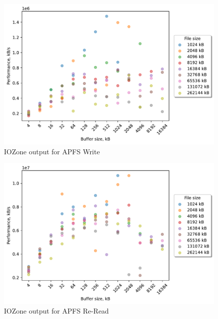 \begin{figure}[!htb]
	\label{fig:bench_apfs_write}
	\begin{center}
		\includegraphics[width=1.0\textwidth]{figures/benchmarking/local/Write.pdf}
	\end{center}
	\caption{IOZone output for \gls{APFS} Write}
\end{figure}

\begin{figure}[!htb]
	\label{fig:bench_apfs_re_read}
	\begin{center}
		\includegraphics[width=1.0\textwidth]{figures/benchmarking/local/Re-Read.pdf}
	\end{center}
	\caption{IOZone output for \gls{APFS} \mbox{Re-Read}}
\end{figure}

